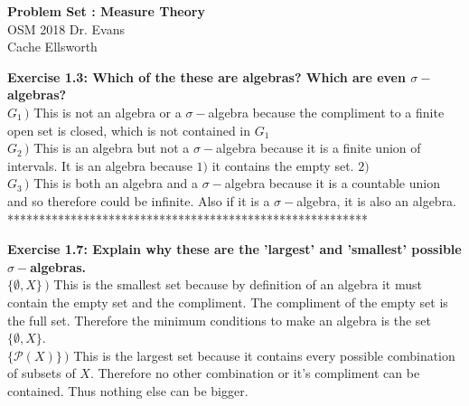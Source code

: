 \documentclass[letterpaper,12pt]{article}
\theoremstyle{definition}
\begin{document}
\begin{flushleft}
  \textbf{\large{Problem Set : Measure Theory}} \\
  OSM 2018 Dr. Evans \\
  Cache Ellsworth
  \end{flushleft}

\vspace{5mm}

\noindent\textbf{Exercise 1.3:
Which of the these are algebras?  Which are even $\sigma-$algebras?}\\
\indent\textbf{$ G_1 \,)$ }This is not an algebra or a $\sigma-$algebra because the compliment to a finite open set is closed, which is not contained in $G_1$ \\
\indent\textbf{$G_2 \,)$ } This is an algebra but not a $\sigma-$algebra because it is a finite union of intervals. It is an algebra because $1)$ it contains the empty set. $2)$\\
\indent\textbf{$G_3 \,)$ } This is both an algebra and a $\sigma-$algebra because it is a countable union and so therefore could be infinite.  Also if it is a $\sigma-$algebra, it is also an algebra. *********************************************************\\

\vspace{5mm}

\noindent\textbf{Exercise 1.7:
Explain why these are the 'largest' and 'smallest' possible $\sigma-$algebras.}\\
\indent\textbf{$\{\emptyset, X\}\,)$} This is the smallest set because by definition of an algebra it must contain the empty set and the compliment.  The compliment of the empty set is the full set.  Therefore the minimum conditions to make an algebra is the set $\{\emptyset, X\}$.\\
\indent \textbf{$\{\mathcal{P}(X)\}\,)$} This is the largest set because it contains every possible combination of subsets of $X$.  Therefore no other combination or it's compliment can be contained. Thus nothing else can be bigger.\\

\vspace{5mm}
\end{document}
